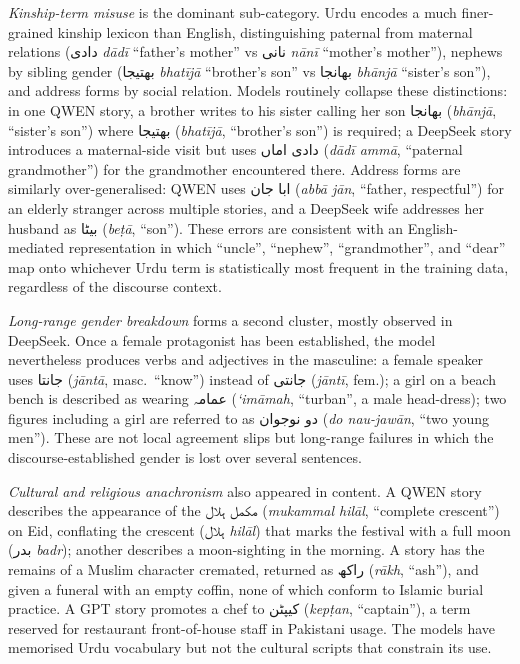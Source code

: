 \documentclass[11pt]{article}
\begin{document}
\textit{Kinship-term misuse} is the dominant
sub-category. Urdu encodes a much finer-grained
kinship lexicon than English, distinguishing
paternal from maternal relations
(\foreignlanguage{arabic}{دادی} \textit{dādī}
``father's mother'' vs \foreignlanguage{arabic}{نانی}
\textit{nānī} ``mother's mother''), nephews by
sibling gender (\foreignlanguage{arabic}{بھتیجا}
\textit{bhatījā} ``brother's son'' vs
\foreignlanguage{arabic}{بھانجا} \textit{bhānjā}
``sister's son''), and address forms by social
relation. Models routinely collapse these
distinctions: in one QWEN story, a brother writes
to his sister calling her son
\foreignlanguage{arabic}{بھانجا} (\textit{bhānjā},
``sister's son'') where
\foreignlanguage{arabic}{بھتیجا} (\textit{bhatījā},
``brother's son'') is required; a DeepSeek story
introduces a maternal-side visit but uses
\foreignlanguage{arabic}{دادی اماں} (\textit{dādī
ammā}, ``paternal grandmother'') for the
grandmother encountered there. Address forms are
similarly over-generalised: QWEN uses
\foreignlanguage{arabic}{ابا جان} (\textit{abbā
jān}, ``father, respectful'') for an elderly
stranger across multiple stories, and a DeepSeek
wife addresses her husband as
\foreignlanguage{arabic}{بیٹا} (\textit{beṭā},
``son''). These errors are consistent with an
English-mediated representation in which
``uncle'', ``nephew'', ``grandmother'', and
``dear'' map onto whichever Urdu term is
statistically most frequent in the training data,
regardless of the discourse context.

\textit{Long-range gender breakdown} forms a second
cluster, mostly observed in DeepSeek. Once a female
protagonist has been established, the model
nevertheless produces verbs and adjectives in the
masculine: a female speaker uses
\foreignlanguage{arabic}{جانتا} (\textit{jāntā},
masc.\ ``know'') instead of
\foreignlanguage{arabic}{جانتی} (\textit{jāntī},
fem.); a girl on a beach bench is described as
wearing \foreignlanguage{arabic}{عمامہ}
(\textit{`imāmah}, ``turban'', a male head-dress);
two figures including a girl are referred to as
\foreignlanguage{arabic}{دو نوجوان} (\textit{do
nau-jawān}, ``two young men''). These are not local
agreement slips but long-range failures in which
the discourse-established gender is lost over
several sentences.

\textit{Cultural and religious anachronism} also appeared in content. A QWEN story
describes the appearance of the
\foreignlanguage{arabic}{مکمل ہلال} (\textit{mukammal
hilāl}, ``complete crescent'') on Eid, conflating
the crescent (\foreignlanguage{arabic}{ہلال}
\textit{hilāl}) that marks the festival with a full
moon (\foreignlanguage{arabic}{بدر} \textit{badr});
another describes a moon-sighting in the morning. A
story has the remains of a Muslim character
cremated, returned as
\foreignlanguage{arabic}{راکھ} (\textit{rākh},
``ash''), and given a funeral with an empty coffin,
none of which conform to Islamic burial practice. A
GPT story promotes a chef to
\foreignlanguage{arabic}{کیپٹن} (\textit{kepṭan},
``captain''), a term reserved for restaurant
front-of-house staff in Pakistani usage. The models
have memorised Urdu vocabulary but not the cultural
scripts that constrain its use.
\end{document}
